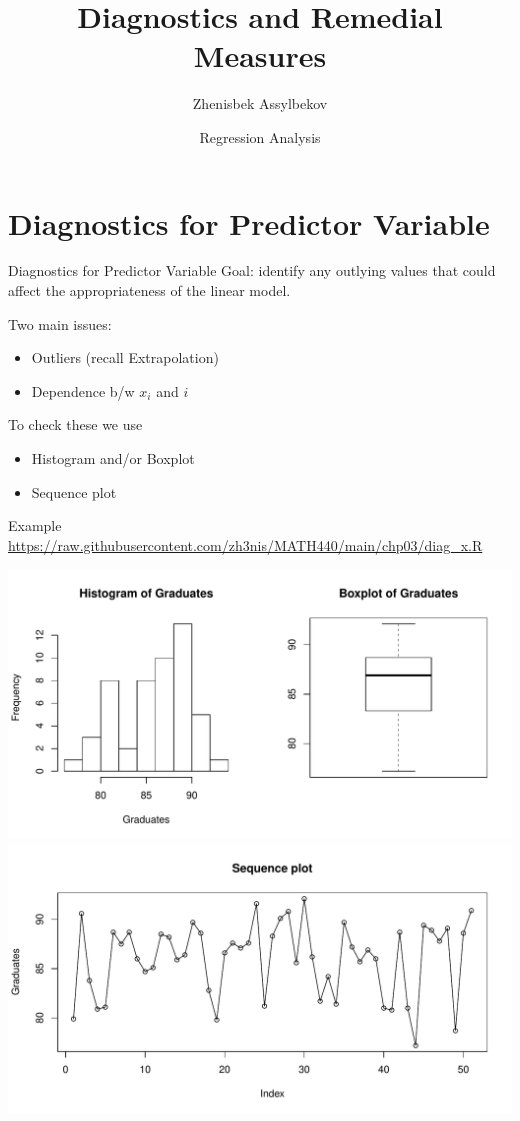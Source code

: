 \documentclass{beamer}
\title{Diagnostics and Remedial Measures}
\author{Zhenisbek Assylbekov}
\institute{Department of Mathematics}
\date{Regression Analysis}
\begin{document}
\begin{frame}
  \titlepage
\end{frame}

\section{Diagnostics for Predictor Variable}

\begin{frame}{Diagnostics for Predictor Variable}
Goal: identify any outlying values that could affect the appropriateness of the linear model.
\vspace{10pt}

\pause Two main issues:
\begin{itemize}
    \item \pause Outliers (recall Extrapolation)
    \item \pause Dependence b/w $x_i$ and $i$
\end{itemize}
\vspace{10pt}

\pause To check these we use
\begin{itemize}
    \item Histogram and/or Boxplot
    \item Sequence plot
\end{itemize}
\end{frame}


\begin{frame}{Example}
{\color{blue}\url{https://raw.githubusercontent.com/zh3nis/MATH440/main/chp03/diag_x.R}}
\begin{center}
\includegraphics[width=.65\textwidth]{plots/hist_bp_x.pdf}\\
\includegraphics[width=.65\textwidth]{plots/seq_x.pdf}
\end{center}
\end{frame}
\end{document}
